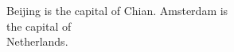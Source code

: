 \documentclass[•]{article}
\begin{document}
Beijing is 
the capital of 
Chian.
Amsterdam is \\ the capital of \\
Netherlands.
\end{document}
